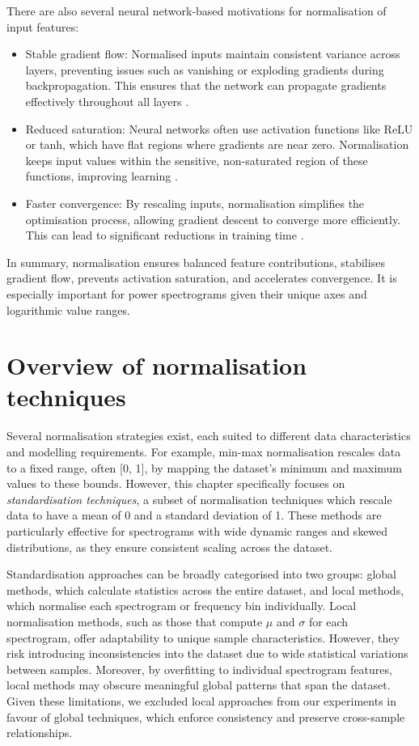 There are also several neural network-based motivations for normalisation of input features:
\begin{itemize}
    \item Stable gradient flow: Normalised inputs maintain consistent variance across layers, preventing issues such as vanishing or exploding gradients during backpropagation. This ensures that the network can propagate gradients effectively throughout all layers \cite{glorot_understanding_2010, wu_group_2018, pons_deep_2019}.
    \item Reduced saturation: Neural networks often use activation functions like ReLU or tanh, which have flat regions where gradients are near zero. Normalisation keeps input values within the sensitive, non-saturated region of these functions, improving learning \cite{glorot_understanding_2010}.
    \item Faster convergence: By rescaling inputs, normalisation simplifies the optimisation process, allowing gradient descent to converge more efficiently. This can lead to significant reductions in training time \cite{montavon_efficient_2012}.
\end{itemize}

In summary, normalisation ensures balanced feature contributions, stabilises gradient flow, prevents activation saturation, and accelerates convergence. It is especially important for power spectrograms given their unique axes and logarithmic value ranges.

\section{Overview of normalisation techniques}

Several normalisation strategies exist, each suited to different data characteristics and modelling requirements. For example, min-max normalisation rescales data to a fixed range, often [0, 1], by mapping the dataset's minimum and maximum values to these bounds. However, this chapter specifically focuses on \textit{standardisation techniques}, a subset of normalisation techniques which rescale data to have a mean of 0 and a standard deviation of 1. These methods are particularly effective for spectrograms with wide dynamic ranges and skewed distributions, as they ensure consistent scaling across the dataset.

Standardisation approaches can be broadly categorised into two groups: global methods, which calculate statistics across the entire dataset, and local methods, which normalise each spectrogram or frequency bin individually. Local normalisation methods, such as those that compute $\mu$ and $\sigma$ for each spectrogram, offer adaptability to unique sample characteristics. However, they risk introducing inconsistencies into the dataset due to wide statistical variations between samples. Moreover, by overfitting to individual spectrogram features, local methods may obscure meaningful global patterns that span the dataset. Given these limitations, we excluded local approaches from our experiments in favour of global techniques, which enforce consistency and preserve cross-sample relationships.

